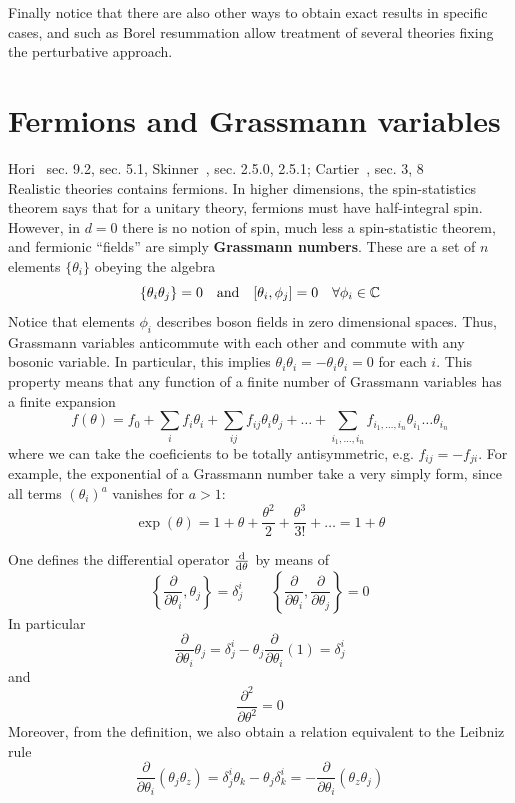 \documentclass[../main/main.tex]{subfiles}
\begin{document}
Finally notice that there are also other ways to obtain exact results in specific cases, and such as Borel resummation allow treatment of several theories fixing the perturbative approach. 

\section{Fermions and Grassmann variables}

\textsf{Hori~\cite{Hori:2003ic} sec. 9.2, sec. 5.1, Skinner~\cite{Skinner:2018aa}, sec. 2.5.0, 2.5.1; Cartier~\cite{Cartier:2002aa}, sec. 3, 8}\\

Realistic theories contains fermions. In higher dimensions, the spin-statistics theorem says that for a unitary theory, fermions must have half-integral spin. However, in $d=0$ there is no notion of spin, much less a spin-statistic theorem, and fermionic ``fields'' are simply \textbf{Grassmann numbers}. These are a set of $n$ elements $\{\theta_i\}$ obeying the algebra
\[\{\theta_i\theta_j\}=0\quad\text{and}\quad[\theta_i,\phi_j]=0\quad\forall\phi_i\in\mathbb{C}\]
Notice that elements $\phi_i$ describes boson fields in zero dimensional spaces. 
Thus, Grassmann variables anticommute with each other and commute with any bosonic variable. In particular, this implies $\theta_i\theta_i=-\theta_i\theta_i=0$ for each $i$. This property means that any function of a finite number of Grassmann variables has a finite expansion
\[f(\theta)=f_0+\sum_if_i\theta_i+\sum_{ij}f_{ij}\theta_i\theta_j+\dots+\sum_{i_1,\dots,i_n}f_{i_1,\dots,i_n}\theta_{i_1}\dots\theta_{i_n}\]
where we can take the coeficients to be totally antisymmetric, e.g. $f_{ij}=-f_{ji}$. For example, the exponential of a Grassmann number take a very simply form, since all terms $(\theta_i)^a$ vanishes for $a>1$:
\[\exp(\theta)=1+\theta+\frac{\theta^2}{2}+\frac{\theta^3}{3!}+\dots=1+\theta\]

One defines the differential operator $\frac{\textup{d}}{\textup{d}\theta}$ by means of
\[\left\{\frac{\partial}{\partial\theta_i},\theta_j\right\}=\delta^i_j\qquad\left\{\frac{\partial}{\partial\theta_i},\frac{\partial}{\partial\theta_j}\right\}=0\]
In particular
\[\frac{\partial}{\partial\theta_i}\theta_j=\delta^i_j-\theta_j\frac{\partial}{\partial\theta_i}(1)=\delta^i_j\]
and
\[\frac{\partial^2}{\partial\theta^2}=0\]
Moreover, from the definition, we also obtain a relation equivalent to the Leibniz rule
\[\frac{\partial}{\partial\theta_i}(\theta_j\theta_z)=\delta^i_j\theta_k-\theta_j\delta^i_k=-\frac{\partial}{\partial\theta_i}(\theta_z\theta_j)\]
\end{document}
